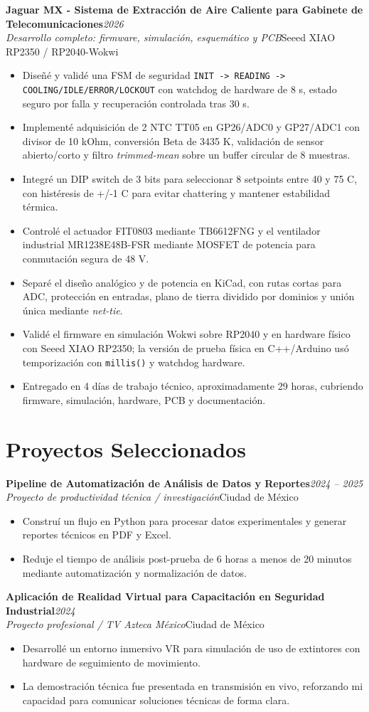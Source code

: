 \documentclass[10pt,a4paper]{article}
\newcommand{\resumeItem}[1]{\item\small #1}
\newcommand{\resumeSubheading}[4]{%
  \vspace{3pt}\noindent
  \textbf{#1}\hfill{\small\textit{\color{graytext}#2}}\\
  \textit{\color{graytext}#3}\hfill{\small\color{graytext}#4}\vspace{2pt}
}
\newcommand{\resumeItemListStart}{\begin{itemize}[leftmargin=1.15em,itemsep=1.5pt,topsep=2pt,partopsep=0pt,parsep=0pt]}
\newcommand{\resumeItemListEnd}{\end{itemize}\vspace{2pt}}
\begin{document}
\resumeSubheading
{Jaguar MX - Sistema de Extracci\'on de Aire Caliente para Gabinete de Telecomunicaciones}{2026}
{Desarrollo completo: firmware, simulaci\'on, esquem\'atico y PCB}{Seeed XIAO RP2350 / RP2040-Wokwi}
\resumeItemListStart
  \resumeItem{Dise\~n\'e y valid\'e una FSM de seguridad \texttt{INIT -> READING -> COOLING/IDLE/ERROR/LOCKOUT} con watchdog de hardware de 8 s, estado seguro por falla y recuperaci\'on controlada tras 30 s.}
  \resumeItem{Implement\'e adquisici\'on de 2 NTC TT05 en GP26/ADC0 y GP27/ADC1 con divisor de 10 kOhm, conversi\'on Beta de 3435 K, validaci\'on de sensor abierto/corto y filtro \emph{trimmed-mean} sobre un buffer circular de 8 muestras.}
  \resumeItem{Integr\'e un DIP switch de 3 bits para seleccionar 8 setpoints entre 40 y 75 \textdegree C, con hist\'eresis de +/-1 \textdegree C para evitar chattering y mantener estabilidad t\'ermica.}
  \resumeItem{Control\'e el actuador FIT0803 mediante TB6612FNG y el ventilador industrial MR1238E48B-FSR mediante MOSFET de potencia para conmutaci\'on segura de 48 V.}
  \resumeItem{Separ\'e el dise\~no anal\'ogico y de potencia en KiCad, con rutas cortas para ADC, protecci\'on en entradas, plano de tierra dividido por dominios y uni\'on \'unica mediante \emph{net-tie}.}
  \resumeItem{Valid\'e el firmware en simulaci\'on Wokwi sobre RP2040 y en hardware f\'isico con Seeed XIAO RP2350; la versi\'on de prueba f\'isica en C++/Arduino us\'o temporizaci\'on con \texttt{millis()} y watchdog hardware.}
  \resumeItem{Entregado en 4 d\'ias de trabajo t\'ecnico, aproximadamente 29 horas, cubriendo firmware, simulaci\'on, hardware, PCB y documentaci\'on.}
\resumeItemListEnd

\section{Proyectos Seleccionados}

\resumeSubheading
{Pipeline de Automatizaci\'on de An\'alisis de Datos y Reportes}{2024 -- 2025}
{Proyecto de productividad t\'ecnica / investigaci\'on}{Ciudad de M\'exico}
\resumeItemListStart
  \resumeItem{Constru\'i un flujo en Python para procesar datos experimentales y generar reportes t\'ecnicos en PDF y Excel.}
  \resumeItem{Reduje el tiempo de an\'alisis post-prueba de 6 horas a menos de 20 minutos mediante automatizaci\'on y normalizaci\'on de datos.}
\resumeItemListEnd

\resumeSubheading
{Aplicaci\'on de Realidad Virtual para Capacitaci\'on en Seguridad Industrial}{2024}
{Proyecto profesional / TV Azteca M\'exico}{Ciudad de M\'exico}
\resumeItemListStart
  \resumeItem{Desarroll\'e un entorno inmersivo VR para simulaci\'on de uso de extintores con hardware de seguimiento de movimiento.}
  \resumeItem{La demostraci\'on t\'ecnica fue presentada en transmisi\'on en vivo, reforzando mi capacidad para comunicar soluciones t\'ecnicas de forma clara.}
\resumeItemListEnd
\end{document}
